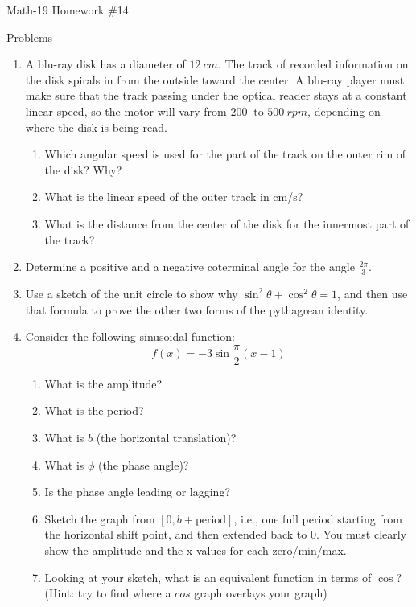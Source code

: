 \documentclass[letterpaper,12pt,fleqn]{article}
\renewcommand{\o}{\theta}
\begin{document}
\begin{center}
\Large Math-19 Homework \#14
\end{center}

\vspace{0.5in}

\underline{Problems}

\begin{enumerate}

\item A blu-ray disk has a diameter of $\SI{12}{cm}$. The track of recorded
information on the disk spirals in from the outside toward the center. A blu-ray
player must make sure that the track passing under the optical reader stays at
a constant linear speed, so the motor will vary from $\SI{200}{}$ to
$\SI{500}{rpm}$, depending on where the disk is being read.
\begin{enumerate}
\item Which angular speed is used for the  part of the track on the outer rim
of the disk? Why?
\item What is the linear speed of the outer track in cm/s?
\item What is the distance from the center of the disk for the innermost part
of the track?
\end{enumerate}

\item Determine a positive and a negative coterminal angle for the angle
$\frac{2\pi}{3}$.

\item Use a sketch of the unit circle to show why $\sin^2\o+\cos^2\o=1$, and
then use that formula to prove the other two forms of the pythagrean identity.

\item Consider the following sinusoidal function:
\[f(x)=-3\sin\frac{\pi}{2}(x-1)\]
\begin{enumerate}
\item What is the amplitude?
\item What is the period?
\item What is $b$ (the horizontal translation)?
\item What is $\phi$ (the phase angle)?
\item Is the phase angle leading or lagging?
\item Sketch the graph from $[0, b+\mbox{period}]$, i.e., one full period
starting from the horizontal shift point, and then extended back to 0. You must
clearly show the amplitude and the x values for each zero/min/max.
\item Looking at your sketch, what is an equivalent function in terms of
$\cos$? (Hint: try to find where a $cos$ graph overlays your graph)
\end{enumerate}

\end{enumerate}
 
\end{document}
